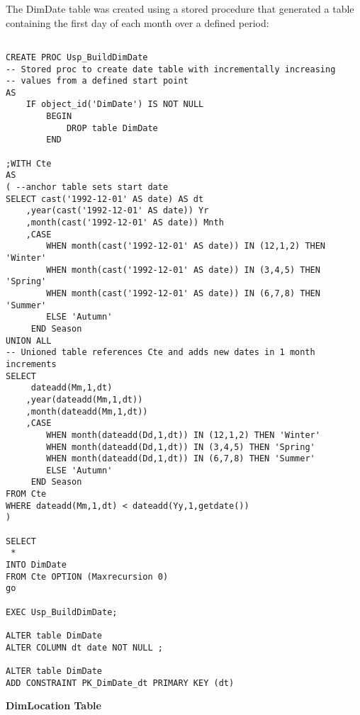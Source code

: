 \documentclass{article}
\begin{document}
The DimDate table was created using a stored procedure that generated a table containing the first day of each month over a defined period:
\begin{lstlisting}

CREATE PROC Usp_BuildDimDate
-- Stored proc to create date table with incrementally increasing 
-- values from a defined start point
AS 
	IF object_id('DimDate') IS NOT NULL 
		BEGIN 
			DROP table DimDate
		END  

;WITH Cte 
AS 
( --anchor table sets start date
SELECT cast('1992-12-01' AS date) AS dt
	,year(cast('1992-12-01' AS date)) Yr
	,month(cast('1992-12-01' AS date)) Mnth
	,CASE 
		WHEN month(cast('1992-12-01' AS date)) IN (12,1,2) THEN 'Winter' 
		WHEN month(cast('1992-12-01' AS date)) IN (3,4,5) THEN 'Spring' 
		WHEN month(cast('1992-12-01' AS date)) IN (6,7,8) THEN 'Summer' 
		ELSE 'Autumn' 
	 END Season 
UNION ALL
-- Unioned table references Cte and adds new dates in 1 month increments
SELECT 
	 dateadd(Mm,1,dt)
	,year(dateadd(Mm,1,dt))
	,month(dateadd(Mm,1,dt))
	,CASE 
		WHEN month(dateadd(Dd,1,dt)) IN (12,1,2) THEN 'Winter' 
		WHEN month(dateadd(Dd,1,dt)) IN (3,4,5) THEN 'Spring' 
		WHEN month(dateadd(Dd,1,dt)) IN (6,7,8) THEN 'Summer' 
		ELSE 'Autumn' 
	 END Season
FROM Cte 
WHERE dateadd(Mm,1,dt) < dateadd(Yy,1,getdate()) 
)  

SELECT
 * 
INTO DimDate 
FROM Cte OPTION (Maxrecursion 0)
go

EXEC Usp_BuildDimDate;

ALTER table DimDate
ALTER COLUMN dt date NOT NULL ;

ALTER table DimDate
ADD CONSTRAINT PK_DimDate_dt PRIMARY KEY (dt)

\end{lstlisting}
\bigskip

\noindent
\textbf{DimLocation Table}
\end{document}
